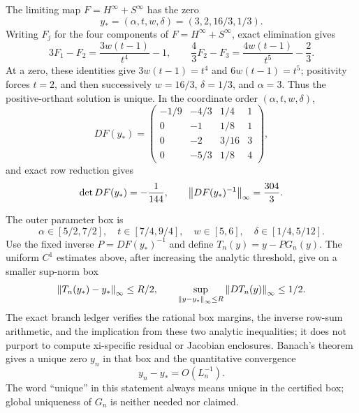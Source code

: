 \documentclass[12pt]{article}
\begin{document}
The limiting map $F=H^\infty+S^\infty$ has the zero
\begin{equation}\label{eq:ystar}
 y_*=(\alpha,t,w,\delta)=(3,2,16/3,1/3).
\end{equation}
Writing $F_j$ for the four components of $F=H^\infty+S^\infty$, exact
elimination gives
\begin{equation}\label{eq:positive-unique}
 3F_1-F_2=\frac{3w(t-1)}{t^4}-1,
 \qquad
 \frac43F_2-F_3=\frac{4w(t-1)}{t^5}-\frac23.
\end{equation}
At a zero, these identities give $3w(t-1)=t^4$ and
$6w(t-1)=t^5$; positivity forces $t=2$, and then successively
$w=16/3$, $\delta=1/3$, and $\alpha=3$.  Thus the positive-orthant solution
is unique.  In the coordinate order
$(\alpha,t,w,\delta)$,
\begin{equation}\label{eq:jacobian}
 DF(y_*)=
 \begin{pmatrix}
 -1/9&-4/3&1/4&1\\
 0&-1&1/8&1\\
 0&-2&3/16&3\\
 0&-5/3&1/8&4
 \end{pmatrix},
\end{equation}
and exact row reduction gives
\begin{equation}\label{eq:jacobian-data}
 \det DF(y_*)=-\frac1{144},\qquad
 \left\lVert DF(y_*)^{-1}\right\rVert_\infty=\frac{304}{3}.
\end{equation}

The outer parameter box is
\begin{equation}\label{eq:outer-box}
 \alpha\in[5/2,7/2],\quad t\in[7/4,9/4],\quad
 w\in[5,6],\quad\delta\in[1/4,5/12].
\end{equation}
Use the fixed inverse $P=DF(y_*)^{-1}$ and define
$T_n(y)=y-PG_n(y)$.  The uniform $C^1$ estimates above, after increasing the
analytic threshold, give on a smaller sup-norm box
\begin{equation}\label{eq:contraction-cert}
 \left\lVert T_n(y_*)-y_*\right\rVert_\infty\le R/2,
 \qquad
 \sup_{\left\lVert y-y_*\right\rVert_\infty\le R}\left\lVert DT_n(y)\right\rVert_\infty\le1/2.
\end{equation}
The exact branch ledger verifies the rational box margins, the inverse
row-sum arithmetic, and the implication from these two analytic inequalities;
it does not purport to compute xi-specific residual or Jacobian enclosures.
Banach's theorem gives a unique zero $y_n$ in that box and the quantitative
convergence
\begin{equation}\label{eq:branch-rate}
 y_n-y_*=O(L_n^{-1}).
\end{equation}
The word ``unique'' in this statement always means unique in the certified
box; global uniqueness of $G_n$ is neither needed nor claimed.
\end{document}

